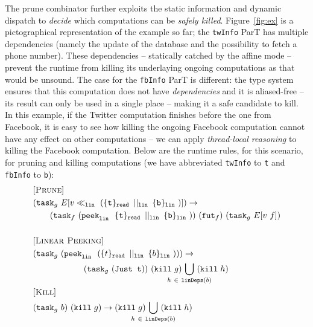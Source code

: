 \documentclass[sigplan]{acmart}
\begin{document}
The prune combinator further exploits the static information and dynamic dispatch to
\emph{decide} which computations can be \emph{safely killed}. Figure~\ref{fig:ex}
is a pictographical representation of the example so far;
the \verb|twInfo| ParT has multiple dependencies (namely the update of the
database and the possibility to fetch a phone number). These dependencies
-- statically catched by the affine mode --
prevent the runtime from killing its underlaying ongoing computations
as that would be unsound.
%
The case for the \verb|fbInfo| ParT is different:
the type system ensures that this computation
does not have \emph{dependencies} and it is aliased-free
 -- its result can only be used in a single place --
making it a safe candidate to kill.
In this example,
if the Twitter computation finishes before the one from Facebook,
it is easy to see how killing the ongoing Facebook computation
cannot have any effect on other computations --
we can apply \emph{thread-local reasoning} to killing the Facebook computation.
Below are the runtime rules, for this scenario, for pruning and killing computations
(we have abbreviated \verb|twInfo| to \verb|t| and \verb|fbInfo| to \verb|b|):
%
\small{
\begin{align*}
&[\textsc{Prune}]\\
& \TT{\prunen{\lin{}}
             {v}
             {(\parrn{\lin{}}
                    {\single{\texttt{t}}_{\un{}}}
                    {\single{\texttt{b}}_{\lin{}}})}}
\to \\
& %
\qquad \atask{f}
      {(\peekn{\lin{}}
              {}
              {
                \parrn{\lin{}}
                      {\single{\texttt{t}}_{\un{}}}
                      {\single{\texttt{b}}_{\lin{}}}
              }
       )
      }\
 \sfut{f}\
\TT{v\ f} \\
\\
&[\textsc{Linear Peeking}] \\
&\atask{g}{(\peekn{\lin{}}{}{(
                    \parrn{\lin{}}{\single{t}_{\un{}}}{\single{b}_{\lin{}}}
                    )}
                )}
\to \\
&
\qquad \qquad \qquad
\atask{g}{(\texttt{Just t})}\
\apoison{g} \
 \underset{
     \mathclap{
       h\ \in\ \texttt{linDeps}(b)
     }
 }{\bigcup}\ \apoison{h}
\\
&[\textsc{Kill}] \\
& \atask{g}{b} \ \apoison{g}
\to
\apoison{g} \
\underset{
  \mathclap{
    h\ \in\ \texttt{linDeps}(b)
  }
}{\bigcup}\ \apoison{h}
\end{align*}
}
\end{document}

